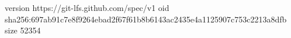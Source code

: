 version https://git-lfs.github.com/spec/v1
oid sha256:697ab91c7e8f9264ebad2f67f61b8b6143ac2435e4a1125907c753c2213a8dfb
size 52354
